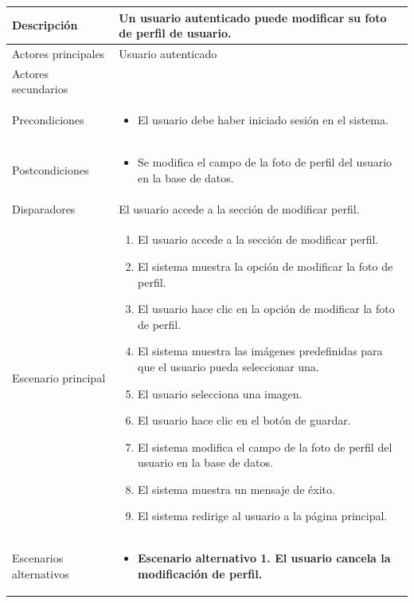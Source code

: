 \begin{longtable}{
    >{\columncolor{lightgreen!20}}p{4cm}
    p{12cm}
    }
    \midrule
    Descripción & Un usuario autenticado puede modificar su foto de perfil de usuario. \\
    \midrule
    Actores principales & Usuario autenticado \\
    \midrule
    Actores secundarios &  \\
    \midrule
    Precondiciones & \begin{itemize}[nosep,leftmargin=*]
        \item El usuario debe haber iniciado sesión en el sistema.
    \end{itemize} \\
    \midrule
    Postcondiciones & \begin{itemize}[nosep,leftmargin=*]
        \item Se modifica el campo de la foto de perfil del usuario en la base de datos.
    \end{itemize} \\
    \midrule
    Disparadores & El usuario accede a la sección de modificar perfil. \\
    \midrule
    Escenario principal & \begin{enumerate}[nosep,leftmargin=*]
        \item El usuario accede a la sección de modificar perfil.
        \item El sistema muestra la opción de modificar la foto de perfil.
        \item El usuario hace clic en la opción de modificar la foto de perfil.
        \item El sistema muestra las imágenes predefinidas para que el usuario pueda seleccionar una.
        \item El usuario selecciona una imagen.
        \item El usuario hace clic en el botón de guardar.
        \item El sistema modifica el campo de la foto de perfil del usuario en la base de datos.
        \item El sistema muestra un mensaje de éxito.
        \item El sistema redirige al usuario a la página principal.
    \end{enumerate} \\
    \midrule
    Escenarios alternativos & 
    \begin{itemize}[nosep,leftmargin=*]
        \item \textbf{Escenario alternativo 1. El usuario cancela la modificación de perfil.}

\end{itemize}
\end{longtable}
